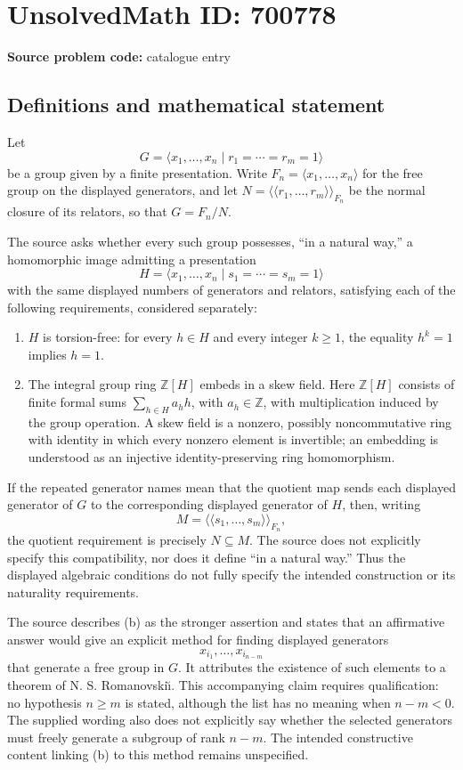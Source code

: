 \documentclass[11pt]{article}
\newcommand{\Z}{\mathbb{Z}}
\begin{document}
\section*{UnsolvedMath ID: 700778}
\textbf{Source problem code:} catalogue entry
\subsection{Definitions and mathematical statement}
Let
\[
G=\langle x_1,\ldots,x_n\mid r_1=\cdots=r_m=1\rangle
\]
be a group given by a finite presentation. Write \(F_n=\langle x_1,\ldots,x_n\rangle\) for the free group on the displayed generators, and let \(N=\langle\!\langle r_1,\ldots,r_m\rangle\!\rangle_{F_n}\) be the normal closure of its relators, so that \(G=F_n/N\).

The source asks whether every such group possesses, ``in a natural way,'' a homomorphic image admitting a presentation
\[
H=\langle x_1,\ldots,x_n\mid s_1=\cdots=s_m=1\rangle
\]
with the same displayed numbers of generators and relators, satisfying each of the following requirements, considered separately:
\begin{enumerate}
\item[(a)] \(H\) is torsion-free: for every \(h\in H\) and every integer \(k\geq 1\), the equality \(h^k=1\) implies \(h=1\).
\item[(b)] The integral group ring \(\Z[H]\) embeds in a skew field. Here \(\Z[H]\) consists of finite formal sums \(\sum_{h\in H}a_hh\), with \(a_h\in\Z\), with multiplication induced by the group operation. A skew field is a nonzero, possibly noncommutative ring with identity in which every nonzero element is invertible; an embedding is understood as an injective identity-preserving ring homomorphism.
\end{enumerate}
If the repeated generator names mean that the quotient map sends each displayed generator of \(G\) to the corresponding displayed generator of \(H\), then, writing
\[
M=\langle\!\langle s_1,\ldots,s_m\rangle\!\rangle_{F_n},
\]
the quotient requirement is precisely \(N\subseteq M\). The source does not explicitly specify this compatibility, nor does it define ``in a natural way.'' Thus the displayed algebraic conditions do not fully specify the intended construction or its naturality requirements.

The source describes (b) as the stronger assertion and states that an affirmative answer would give an explicit method for finding displayed generators
\[
x_{i_1},\ldots,x_{i_{n-m}}
\]
that generate a free group in \(G\). It attributes the existence of such elements to a theorem of N. S. Romanovski\u{\i}. This accompanying claim requires qualification: no hypothesis \(n\geq m\) is stated, although the list has no meaning when \(n-m<0\). The supplied wording also does not explicitly say whether the selected generators must freely generate a subgroup of rank \(n-m\). The intended constructive content linking (b) to this method remains unspecified.
\end{document}
